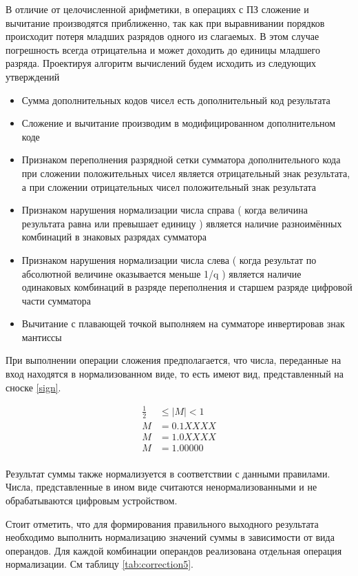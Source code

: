 \documentclass[a4paper,14pt]{extarticle}
\begin{document}
В отличие от целочисленной арифметики, в операциях с ПЗ сложение и вычитание производятся приближенно, так как при выравнивании порядков происходит потеря младших разрядов одного из слагаемых. В этом случае погрешность всегда отрицательна и может доходить до единицы младшего разряда.
Проектируя алгоритм вычислений будем исходить из следующих утверждений
\begin{itemize}
	\item Сумма дополнительных кодов чисел есть дополнительный код результата
	\item Сложение и вычитание производим в модифицированном дополнительном коде
	\item Признаком переполнения разрядной сетки сумматора дополнительного кода при сложении положительных чисел является отрицательный знак результата, а при сложении отрицательных чисел положительный знак результата
	\item Признаком нарушения нормализации числа справа ( когда величина результата равна или превышает единицу ) является наличие разноимённых комбинаций в знаковых разрядах сумматора
	\item  Признаком нарушения нормализации числа слева ( когда результат по абсолютной величине оказывается меньше 1/q ) является наличие одинаковых комбинаций в разряде переполнения и старшем разряде цифровой части сумматора
	\item Вычитание с плавающей точкой выполняем на сумматоре инвертировав знак мантиссы
\end{itemize}
\fi
При выполнении операции сложения предполагается, что числа, переданные на вход находятся в нормализованном виде, то есть имеют вид, представленный на сноске \ref{sign}.

\begin{equation}
\begin{aligned}
\label{sign}
\frac12&\le \left|M\right|< 1\\
M &= 0.1XXXX\\
M &= 1.0XXXX\\
M&=1.00000\\
\end{aligned}
\end{equation}

Результат суммы также нормализуется в соответствии с данными правилами. Числа, представленные в ином виде считаются ненормализованными и не обрабатываются цифровым устройством.

Стоит отметить, что для формирования правильного выходного результата необходимо выполнить нормализацию значений суммы в зависимости от вида операндов. Для каждой комбинации операндов реализована отдельная операция нормализации. См таблицу \ref{tab:correction5}.
\end{document}
